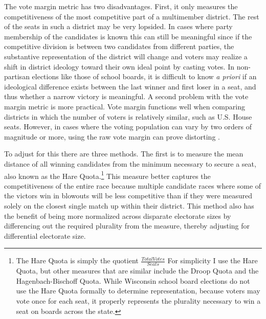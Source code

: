 The vote margin metric has two disadvantages. First, it only measures the 
competitiveness 
of the most competitive part of a multimember district. The rest of the seats in 
such a district may be very lopsided. In cases where party membership of the 
candidates is known this can still be meaningful since if the competitive division 
is between two candidates from different parties, the substantive representation of 
the district will change and voters may realize a shift in district ideology toward 
their own ideal point by casting votes. In non-partisan elections like those of 
school boards, it is difficult to know \emph{a priori} if an ideological difference 
exists between the last winner and first loser in a seat, and thus whether a narrow 
victory is meaningful. A second problem with the vote margin metric is more practical. 
Vote margin functions well when comparing districts in which the number of voters is 
relatively similar, such as U.S. House seats. However, in cases where the voting 
population can vary by two orders of magnitude or more, using the raw vote margin 
can prove distorting \citep{cox88}. 

To adjust for this there are three methods. The first is to measure the mean distance 
of all winning candidates from the minimum necessary to secure a seat, also known 
as the Hare Quota.\footnote{The Hare Quota is simply the quotient $\frac{Total Votes}{Seats}$ For simplicity I use the Hare Quota, but other measures 
that are similar include the Droop Quota and the Hagenbach-Bischoff Quota. While Wisconsin school board elections do not use the Hare Quota formally to determine representation, because 
voters may vote once for each seat, it properly represents the plurality necessary to 
win a seat on boards across the state.} This measure better captures the competitiveness 
of the entire race because multiple candidate races where some of the victors win 
in blowouts will be less competitive than if they were measured solely on the 
closest single match up within their district. This method also has the benefit 
of being more normalized across disparate electorate sizes by differencing out the 
required plurality from the measure, thereby adjusting for differential electorate 
size. 

